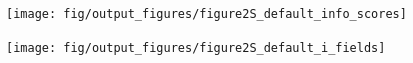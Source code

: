 \documentclass[a4paper,12pt]{article}
\newcommand{\ssc}[3]{\ensuremath{#1_{\text{#2}_{\text{#3}}}}}
\newcommand{\gE      }{\ssc{g}      {\scriptsize{E}}{}}
\newcommand{\gI      }{\ssc{g}      {\scriptsize{I}}{}}
\begin{document}
{\begin{figure}[p]
    \internallinenumbers
    \centering
        \texttt{[image: fig/output\_figures/figure2S\_default\_info\_scores]}
    \caption{}
\end{figure}

\clearpage

%

\begin{figure}[p]
    \internallinenumbers
    \centering
        \texttt{[image: fig/output\_figures/figure2S\_default\_i\_fields]}
    \caption{}
\end{figure}

\clearpage

%

}
\end{document}
